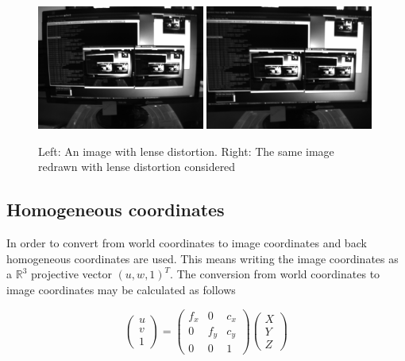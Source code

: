 \begin{figure}[h]
  \centering
    \includegraphics[width=0.49\textwidth]{chapters/images/distorted}
    \includegraphics[width=0.49\textwidth]{chapters/images/undistorted}
  \caption{Left: An image with lense distortion.  Right: The same image redrawn with lense distortion considered}
 \label{fig:lense_distortion}
\end{figure}

\subsection{Homogeneous coordinates}

In order to convert from world coordinates to image coordinates and back homogeneous coordinates are used.  This means writing the image coordinates as a $\mathbb R^3$ projective vector $(u, w, 1)^T$.  The conversion from world coordinates to image coordinates may be calculated as follows

\begin{equation}
 \begin{pmatrix}
  u \\
  v \\
  1 
 \end{pmatrix} =
 \begin{pmatrix}
  f_x & 0 & c_x \\
  0 & f_y & c_y \\
  0 & 0   & 1 
 \end{pmatrix}
 \begin{pmatrix}
  X \\ Y \\ Z
 \end{pmatrix}
\end{equation}

